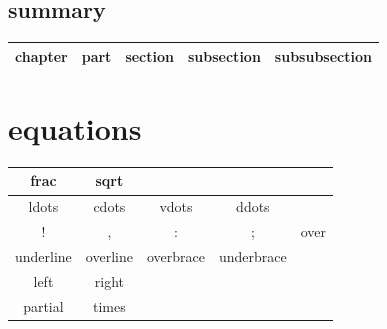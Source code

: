 \documentclass{article}[20pt]{}
\begin{document}
\subsection{summary}

\begin{tabular}{|c|c|c|c|c|}\hline
	chapter & part & section & subsection & subsubsection \\ \hline
\end{tabular}
\section{equations}
\begin{tabular}{|c|c|c|c|c|}\hline
	frac & sqrt & & & \\ \hline
	ldots & cdots & vdots  &  ddots &\\ \hline
	! & , & : & ; & over \\ \hline
	underline & overline & overbrace & underbrace & \\ \hline
	 left & right & & &\\ \hline
	 partial & times & & &\\ \hline
\end{tabular} 
\end{document}
